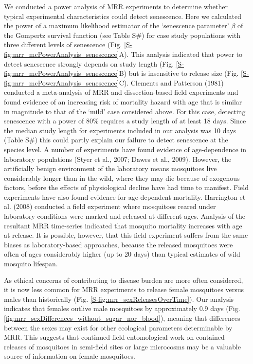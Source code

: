 \documentclass[]{article}
\begin{document}
We conducted a power analysis of MRR experiments to determine
whether typical experimental characteristics could detect senescence.
Here we calculated the power of a maximum likelihood estimator of the
`senescence parameter' $\beta$ of the Gompertz survival function (see Table
S\#) for case study populations with three different levels of
senescence (Fig. \ref{S-fig:mrr_mcPowerAnalysis_senescence}A). This analysis indicated that power to detect
senescence strongly depends on study length (Fig. \ref{S-fig:mrr_mcPowerAnalysis_senescence}B) but is
insensitive to release size (Fig. \ref{S-fig:mrr_mcPowerAnalysis_senescence}C). Clements and Patterson (1981)
conducted a meta-analysis of MRR and dissection-based field experiments
and found evidence of an increasing risk of mortality hazard with age
that is similar in magnitude to that of the `mild' case considered
above. For this case, detecting senescence with a power of 80\% requires
a study length of at least 18 days. Since the median study length for
experiments included in our analysis was 10 days (Table S\#) this could
partly explain our failure to detect senescence at the species level. A
number of experiments have found evidence of age-dependence in
laboratory populations (Styer et al., 2007; Dawes et al., 2009).
However, the artificially benign environment of the laboratory means
mosquitoes live considerably longer than in the wild, where they may die
because of exogenous factors, before the effects of physiological
decline have had time to manifest. Field experiments have also found
evidence for age-dependent mortality. Harrington et al. (2008) conducted
a field experiment where mosquitoes reared under laboratory conditions
were marked and released at different ages. Analysis of the resultant
MRR time-series indicated that mosquito mortality increases with age at
release. It is possible, however, that this field experiment suffers
from the same biases as laboratory-based approaches, because the
released mosquitoes were often of ages considerably higher (up to 20
days) than typical estimates of wild mosquito lifespan.

As ethical concerns of contributing to disease burden are more often
considered, it is now less common for MRR experiments to release female
mosquitoes versus males than historically (Fig. \ref{S-fig:mrr_sexReleasesOverTime}). Our analysis
indicates that females outlive male mosquitoes by approximately 0.9 days
(Fig. \ref{fig:mrr_sexDifferences_without_sugar_nor_blood}), meaning that differences between the sexes may exist for
other ecological parameters determinable by MRR. This suggests that
continued field entomological work on contained releases of mosquitoes
in semi-field sites or large microcosms may be a valuable source of
information on female mosquitoes.
\end{document}
